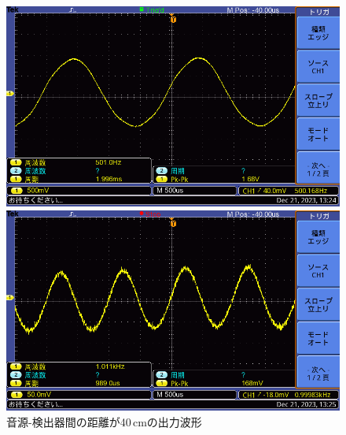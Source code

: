 \documentclass{ltjsarticle}
\begin{document}
\begin{figure}[H]
\begin{minipage}{0.4\columnwidth}
			\end{minipage}
			\hspace{0.04\columnwidth}
			\begin{minipage}{0.4\columnwidth}
			\centering
			\includegraphics[width = \columnwidth]{figs/F0034TEK.PNG}
			\end{minipage}
			\hspace{0.04\columnwidth}
			\begin{minipage}{0.4\columnwidth}
			\centering
			\includegraphics[width = \columnwidth]{figs/F0035TEK.PNG}
			\end{minipage}
			\caption{音源-検出器間の距離が40\,cmの出力波形}
			\label{fig:week5-3-40}
			\end{figure}
\end{document}
